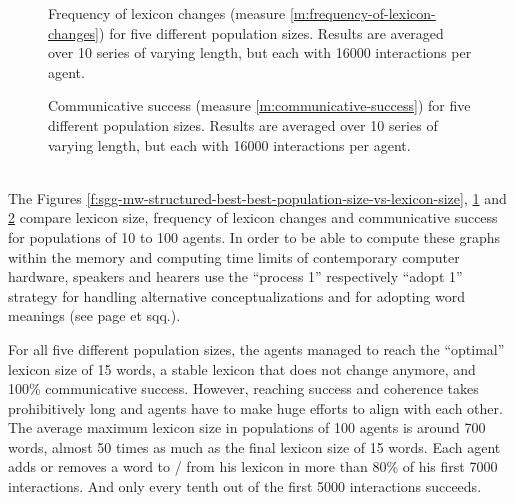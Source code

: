 \begin{figure}[p]
  \caption{Frequency of lexicon changes (measure
    \ref{m:frequency-of-lexicon-changes}) for five different population
    sizes. Results are averaged over 10 series of varying length, but
    each with 16000 interactions per agent.}
  \label{f:sgg-mw-structured-best-best-population-size-vs-lexicon-changes}
\end{figure}


\begin{figure}[p]
  \caption{Communi\-cative success (measure
    \ref{m:communicative-success}) for five different population
    sizes. Results are averaged over 10 series of varying length, but
    each with 16000 interactions per agent.}
  \label{f:sgg-mw-structured-best-best-population-size-vs-communicative-success}
\end{figure}

\stopfiguregroup

~\\

The Figures
\ref{f:sgg-mw-structured-best-best-population-size-vs-lexicon-size},
\ref{f:sgg-mw-structured-best-best-population-size-vs-lexicon-changes}
and
\ref{f:sgg-mw-structured-best-best-population-size-vs-communicative-success}
compare lexicon size, frequency of lexicon changes and communicative
success for populations of 10 to 100 agents. In order to be able to
compute these graphs within the memory and computing time limits of
contemporary computer hardware, speakers and hearers use the ``process
1'' respectively ``adopt 1'' strategy for handling alternative
conceptualizations and for adopting word meanings (see page
\pageref{f:sgg-sw-unstructured-50-attrs-conceptualization-handling-vs-lexicon-changes}
et sqq.).

For all five different population sizes, the agents managed to reach
the ``optimal'' lexicon size of 15 words, a stable lexicon that does
not change anymore, and 100\% communicative success. However, reaching
success and coherence takes prohibitively long and agents have to make
huge efforts to align with each other. The average maximum lexicon
size in populations of 100 agents is around 700 words, almost 50 times
as much as the final lexicon size of 15 words. Each agent adds or
removes a word to / from his lexicon in more than 80\% of his first
7000 interactions. And only every tenth out of the first 5000
interactions succeeds. 

